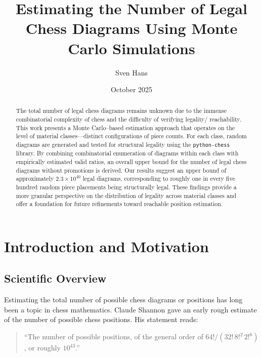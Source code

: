 \documentclass[12pt]{article}
\title{Estimating the Number of Legal Chess Diagrams Using Monte Carlo Simulations}
\author{Sven Hans}
\date{October 2025}
\begin{document}
\maketitle

\begin{abstract}
The total number of legal chess diagrams remains unknown due to the immense combinatorial complexity of chess and the difficulty of verifying legality/ reachability. This work presents a Monte Carlo–based estimation approach that operates on the level of material classes—distinct configurations of piece counts. For each class, random diagrams are generated and tested for structural legality using the \texttt{python-chess} library. By combining combinatorial enumeration of diagrams within each class with empirically estimated valid ratios, an overall upper bound for the number of legal chess diagrams without promotions is derived. Our results suggest an upper bound of approximately $2.3\times10^{40}$ legal diagrams, corresponding to roughly one in every five hundred random piece placements being structurally legal. These findings provide a more granular perspective on the distribution of legality across material classes and offer a foundation for future refinements toward reachable position estimation.
\end{abstract}

\section{Introduction and Motivation}

\subsection{Scientific Overview}

Estimating the total number of possible chess diagrams or positions has long been a topic in chess mathematics. Claude Shannon \cite{shannon1950} gave an early rough estimate of the number of possible chess positions. His statement reads:

\begin{quote}
``The number of possible positions, of the general order of 
$64! / (32! \, 8!^2 \, 2!^6)$, or roughly $10^{43}$.''
\end{quote}
\end{document}
